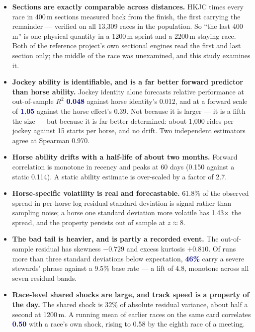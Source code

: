 \documentclass[11pt,a4paper]{article}
\newcommand{\good}[1]{\textcolor{darkblue}{\textbf{#1}}}
\begin{document}
\begin{itemize}\itemsep2pt
\item \textbf{Sections are exactly comparable across distances.} HKJC times every
race in 400\,m sections measured back from the finish, the first carrying the
remainder --- verified on all 13{,}309 races in the population. So ``the last
400\,m'' is one physical quantity in a 1200\,m sprint and a 2200\,m staying race.
Both of the reference project's own sectional engines read the first and last
section only; the middle of the race was unexamined, and this study examines it.

\item \textbf{Jockey ability is identifiable, and is a far better forward
predictor than horse ability.} Jockey identity alone forecasts relative
performance at out-of-sample $R^2$ \good{0.048} against horse identity's 0.012,
and at a forward scale of \good{1.05} against the horse effect's 0.39. Not because
it is larger --- it is a fifth the size --- but because it is far better
determined: about 1{,}000 rides per jockey against 15 starts per horse, and no
drift. Two independent estimators agree at Spearman 0.970.

\item \textbf{Horse ability drifts with a half-life of about two months.} Forward
correlation is monotone in recency and peaks at 60 days (0.150 against a static
0.114). A static ability estimate is over-scaled by a factor of 2.7.

\item \textbf{Horse-specific volatility is real and forecastable.} 61.8\% of the
observed spread in per-horse log residual standard deviation is signal rather than
sampling noise; a horse one standard deviation more volatile has 1.43$\times$ the
spread, and the property persists out of sample at $z\approx 8$.

\item \textbf{The bad tail is heavier, and is partly a recorded event.} The
out-of-sample residual has skewness $-0.729$ and excess kurtosis $+0.810$. Of runs
more than three standard deviations below expectation, \good{46\%} carry a severe
stewards' phrase against a 9.5\% base rate --- a lift of 4.8, monotone across all
seven residual bands.

\item \textbf{Race-level shared shocks are large, and track speed is a property of
the day.} The shared shock is 32\% of absolute residual variance, about half a
second at 1200\,m. A running mean of earlier races on the same card correlates
\good{0.50} with a race's own shock, rising to 0.58 by the eighth race of a
meeting.
\end{itemize}
\end{document}
